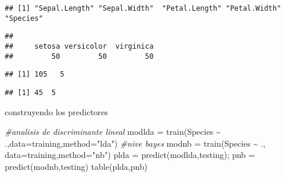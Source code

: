 \documentclass[
]{article}
\newenvironment{Shaded}{\begin{snugshade}}{\end{snugshade}}
\newcommand{\AttributeTok}[1]{\textcolor[rgb]{0.77,0.63,0.00}{#1}}
\newcommand{\CommentTok}[1]{\textcolor[rgb]{0.56,0.35,0.01}{\textit{#1}}}
\newcommand{\ConstantTok}[1]{\textcolor[rgb]{0.00,0.00,0.00}{#1}}
\newcommand{\FloatTok}[1]{\textcolor[rgb]{0.00,0.00,0.81}{#1}}
\newcommand{\FunctionTok}[1]{\textcolor[rgb]{0.00,0.00,0.00}{#1}}
\newcommand{\NormalTok}[1]{#1}
\newcommand{\OtherTok}[1]{\textcolor[rgb]{0.56,0.35,0.01}{#1}}
\newcommand{\SpecialCharTok}[1]{\textcolor[rgb]{0.00,0.00,0.00}{#1}}
\newcommand{\StringTok}[1]{\textcolor[rgb]{0.31,0.60,0.02}{#1}}
\begin{document}
\begin{verbatim}
## [1] "Sepal.Length" "Sepal.Width"  "Petal.Length" "Petal.Width"  "Species"
\end{verbatim}

\begin{Shaded}
\end{Shaded}

\begin{verbatim}
## 
##     setosa versicolor  virginica 
##         50         50         50
\end{verbatim}

\begin{Shaded}
\end{Shaded}

\begin{verbatim}
## [1] 105   5
\end{verbatim}

\begin{verbatim}
## [1] 45  5
\end{verbatim}

construyendo los predictores

\begin{Shaded}
\begin{Highlighting}[]
\CommentTok{\#analisis de discriminante lineal}
\NormalTok{modlda }\OtherTok{=} \FunctionTok{train}\NormalTok{(Species }\SpecialCharTok{\textasciitilde{}}\NormalTok{ .,}\AttributeTok{data=}\NormalTok{training,}\AttributeTok{method=}\StringTok{"lda"}\NormalTok{)}
\CommentTok{\#nive bayes }
\NormalTok{modnb }\OtherTok{=} \FunctionTok{train}\NormalTok{(Species }\SpecialCharTok{\textasciitilde{}}\NormalTok{ ., }\AttributeTok{data=}\NormalTok{training,}\AttributeTok{method=}\StringTok{"nb"}\NormalTok{)}
\NormalTok{plda }\OtherTok{=} \FunctionTok{predict}\NormalTok{(modlda,testing); pnb }\OtherTok{=} \FunctionTok{predict}\NormalTok{(modnb,testing)}
\FunctionTok{table}\NormalTok{(plda,pnb)}
\end{Highlighting}
\end{Shaded}
\end{document}
